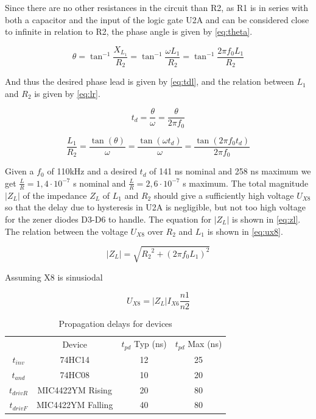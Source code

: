 Since there are no other resistances in the circuit than R2, as R1 is in series with both a capacitor and the input of the logic gate U2A and can be considered close to infinite in relation to R2, the phase angle is given by \cref{eq:theta}.

\begin{equation} \label{eq:theta}
    \theta = {\tan}^{-1}\frac{X_{L_1}}{R_2} = {\tan}^{-1}\frac{\omega L_1}{R_2} = {\tan}^{-1}\frac{2 \pi f_0 L_1}{R_2}
\end{equation}

And thus the desired phase lead is given by \cref{eq:tdl}, and the relation between $L_1$ and $R_2$ is given by \cref{eq:lr}.

\begin{equation} \label{eq:tdl}
    t_{d} = \frac{\theta}{\omega} = \frac{\theta}{2 \pi f_0}
\end{equation}

\begin{equation} \label{eq:lr}
    \frac{L_1}{R_2} = \frac{\tan(\theta)}{\omega} = \frac{\tan(\omega t_{d})}{\omega} = \frac{\tan(2 \pi f_0 t_{d})}{2 \pi f_0}
\end{equation}

Given a $f_0$ of 110kHz and a desired $t_d$ of 141 ns nominal and 258 ns maximum we get $\frac{L}{R} = 1,4 \cdot 10^{-7}$ s nominal and $\frac{L}{R} = 2,6 \cdot 10^{-7}$ s maximum. The total magnitude $|Z_L|$ of the impedance $Z_{L}$ of $L_1$ and $R_2$ should give a sufficiently high voltage $U_{X8}$ so that the delay due to hysteresis in U2A is negligible, but not too high voltage for the zener diodes D3-D6 to handle. The equation for $|Z_L|$ is shown in \cref{eq:zl}. The relation between the voltage $U_{X8}$ over $R_2$ and $L_1$ is shown in \cref{eq:ux8}.

\begin{equation} \label{eq:zl}
    |Z_{L}| = \sqrt{{R_2}^2 + (2 \pi f_0 L_1)^2}
\end{equation}

Assuming X8 is sinusiodal 

\begin{equation} \label{eq:ux8}
    U_{X8} = |Z_L| I_{X6} \frac{n1}{n2}
\end{equation}



\begin{table}[]
    \centering
    \begin{tabular}{c|c|c|c}
                &   Device              & $t_{pd}$ Typ (ns)   & $t_{pd}$ Max (ns) \\
        $t_{inv}$ &   74HC14              & 12            & 25\\
        $t_{and}$ &   74HC08              & 10            & 20\\
        $t_{driv R}$& MIC4422YM Rising    & 20            & 80\\
        $t_{driv F}$& MIC4422YM Falling   & 40            & 80
    \end{tabular}
    \caption{Propagation delays for devices}
    \label{tab:tpd}
\end{table}

